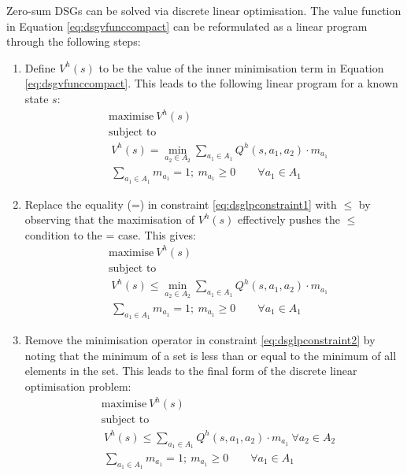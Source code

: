 Zero-sum DSGs can be solved via discrete linear optimisation. The value
function in Equation \eqref{eq:dsgvfunccompact} can be reformulated as a linear
program through the following steps:

\begin{enumerate}
  \item Define $V^h(s)$ to be the value of the inner minimisation term in
            Equation \eqref{eq:dsgvfunccompact}. This leads to the following linear program for a known state $s$:
{\small
\abovedisplayskip=10pt
\belowdisplayskip=0pt 
\begin{subequations}
\begin{align}
&\text{maximise}   \  V^{h}(s) \nonumber \\
&\text{subject to}   \nonumber \\
&\  V^{h}(s) = \min_{a_2 \in A_2} \sum_{a_1 \in A_1} Q^{h}(s, a_1, a_2) \cdot m_{a_{1}} \label{eq:dsglpconstraint1} \\
                          &\  \sum_{a_{1} \in A_1} m_{a_{1}} = 1 ; \  m_{a_{1}} \geq 0 \qquad \forall a_{1} \in A_1 \nonumber
\end{align}
\end{subequations}
}%

  \item Replace the equality (=) in constraint \eqref{eq:dsglpconstraint1} with
  $\leq$ by observing that the maximisation of $V^{h}(s)$
  effectively pushes the $\leq$ condition to the = case. This gives: 
{\small 
\abovedisplayskip=8pt
\belowdisplayskip=0pt
\begin{subequations}
\begin{align}
&\text{maximise}   \  V^{h}(s) \nonumber \\
&\text{subject to}   \nonumber \\
&\  V^{h}(s) \leq \min_{a_2 \in A_2} \sum_{a_1 \in A_1} Q^{h}(s, a_1, a_2) \cdot m_{a_{1}} \label{eq:dsglpconstraint2} \\
                          &\  \sum_{a_{1} \in A_1} m_{a_{1}} = 1 ; \  m_{a_{1}} \geq 0 \qquad \forall a_{1} \in A_1 \nonumber
\end{align}
\end{subequations}
}%
  
  \item Remove the minimisation operator in constraint \eqref{eq:dsglpconstraint2}
            by noting that the minimum of a set is less than or equal to the minimum of all elements in the set.
            This leads to the final form of the discrete linear optimisation problem:
{\small 
\abovedisplayskip=8pt
\belowdisplayskip=0pt
\begin{align*}
&\text{maximise}   \  V^{h}(s) \nonumber \\
&\text{subject to}   \nonumber \\
&\  V^{h}(s) \leq \sum_{a_1 \in A_1} Q^{h}(s, a_1, a_2) \cdot m_{a_{1}} \ \forall a_2 \in A_2\\
                          &\  \sum_{a_{1} \in A_1} m_{a_{1}} = 1 ; \  m_{a_{1}} \geq 0 \qquad \forall a_{1} \in A_1 \nonumber
\end{align*}
}%
\end{enumerate}

